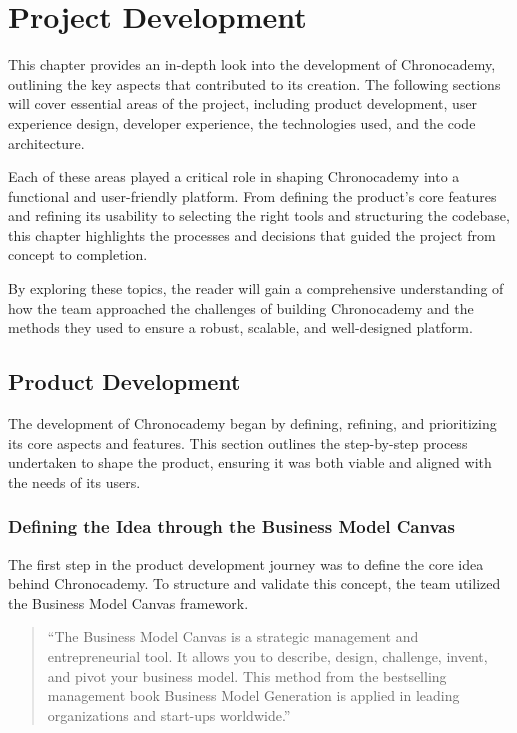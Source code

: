 \chapter{Project Development}\label{ch:project-development}

This chapter provides an in-depth look into the development of Chronocademy, outlining the key aspects that contributed to its creation.
The following sections will cover essential areas of the project, including product development, user experience design, developer experience, the technologies used, and the code architecture.

Each of these areas played a critical role in shaping Chronocademy into a functional and user-friendly platform.
From defining the product's core features and refining its usability to selecting the right tools and structuring the codebase, this chapter highlights the processes and decisions that guided the project from concept to completion.

By exploring these topics, the reader will gain a comprehensive understanding of how the team approached the challenges of building Chronocademy and the methods they used to ensure a robust, scalable, and well-designed platform.

\section{Product Development}\label{sec:productdevelopment}
The development of Chronocademy began by defining, refining, and prioritizing its core aspects and features.
This section outlines the step-by-step process undertaken to shape the product, ensuring it was both viable and aligned with the needs of its users.

\subsection{Defining the Idea through the Business Model Canvas}\label{subsec:business-model-canvas}
The first step in the product development journey was to define the core idea behind Chronocademy.
To structure and validate this concept, the team utilized the Business Model Canvas framework.

\begin{quote}
    ``The Business Model Canvas is a strategic management and entrepreneurial tool.
    It allows you to describe, design, challenge, invent, and pivot your business model.
    This method from the bestselling management book Business Model Generation is applied in leading organizations and start-ups worldwide.''
\end{quote}\cite{business-canvas-model}

